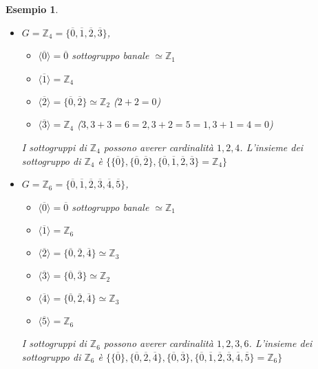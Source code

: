 \documentclass[a4paper,12pt]{article}
\theoremstyle{def}
\theoremstyle{prop}
\theoremstyle{esempio}
\newtheorem*{example}{Esempio}
\theoremstyle{dimostrazione}
\theoremstyle{teo}
\theoremstyle{osservazione}
\begin{document}
\begin{example}
	\
	\begin{itemize}
		\item \(G = \mathbb{Z}_4 = \{\overline{0}, \overline{1}, \overline{2}, \overline{3}\}\), \
		      \begin{itemize}
			      \item \(\langle \overline{0} \rangle = {\overline{0}}\) sottogruppo banale \(\simeq \mathbb{Z}_1\)
			      \item \(\langle \overline{1} \rangle = \mathbb{Z}_4\)
			      \item \(\langle \overline{2} \rangle = \{\overline{0}, \overline{2}\} \simeq \mathbb{Z}_2\) (\(2+2=0\))
			      \item \(\langle \overline{3} \rangle = \mathbb{Z}_4\) (\(3 , 3+3=6=2, 3+2=5=1, 3+1=4=0\))
		      \end{itemize}
		      I sottogruppi di \(\mathbb{Z}_4\) possono averer cardinalità \(1,2,4\). L'insieme
		      dei sottogruppo di \(\mathbb{Z}_4\) è \(\{\{\overline{0}\}, \{\overline{0}, \overline{2}\},
		      \{\overline{0}, \overline{1}, \overline{2}, \overline{3}\}= \mathbb{Z}_4\}\)
		\item \(G = \mathbb{Z}_6 = \{\overline{0}, \overline{1}, \overline{2}, \overline{3}, \overline{4}, \overline{5}\}\), \
		      \begin{itemize}
			      \item \(\langle \overline{0} \rangle = {\overline{0}}\) sottogruppo banale \(\simeq \mathbb{Z}_1\)
			      \item \(\langle \overline{1} \rangle = \mathbb{Z}_6\)
			      \item \(\langle \overline{2} \rangle = \{\overline{0}, \overline{2}, \overline{4}\} \simeq \mathbb{Z}_3\)
			      \item \(\langle \overline{3} \rangle = \{\overline{0}, \overline{3}\} \simeq \mathbb{Z}_2\)
			      \item \(\langle \overline{4} \rangle = \{\overline{0}, \overline{2}, \overline{4}\} \simeq \mathbb{Z}_3\)
			      \item \(\langle \overline{5} \rangle = \mathbb{Z}_6\)
		      \end{itemize}
		      I sottogruppi di \(\mathbb{Z}_6\) possono averer cardinalità \(1,2,3,6\). L'insieme
		      dei sottogruppo di \(\mathbb{Z}_6\) è \(\{\{\overline{0}\}, \{\overline{0}, \overline{2}, \overline{4}\},
		      \{\overline{0}, \overline{3}\}, \{\overline{0}, \overline{1}, \overline{2}, \overline{3}, \overline{4}, \overline{5}\}= \mathbb{Z}_6\}\)
	\end{itemize}
\end{example}
\end{document}
